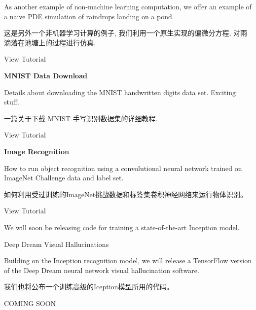 As another example of non-machine learning computation, we offer an example of a naive PDE simulation of raindrops landing on a pond.

这是另外一个非机器学习计算的例子, 我们利用一个原生实现的偏微分方程, 对雨滴落在池塘上的过程进行仿真.

View Tutorial

\textbf{MNIST Data Download}

Details about downloading the MNIST handwritten digits data set. Exciting stuff.

一篇关于下载 MNIST 手写识别数据集的详细教程.

View Tutorial

\textbf{Image Recognition}

How to run object recognition using a convolutional neural network trained on ImageNet Challenge data and label set.

如何利用受过训练的ImageNet挑战数据和标签集卷积神经网络来运行物体识别。

View Tutorial

We will soon be releasing code for training a state-of-the-art Inception model.

Deep Dream Visual Hallucinations

Building on the Inception recognition model, we will release a TensorFlow version of the Deep Dream neural network visual hallucination software.

我们也将公布一个训练高级的Iception模型所用的代码。

COMING SOON